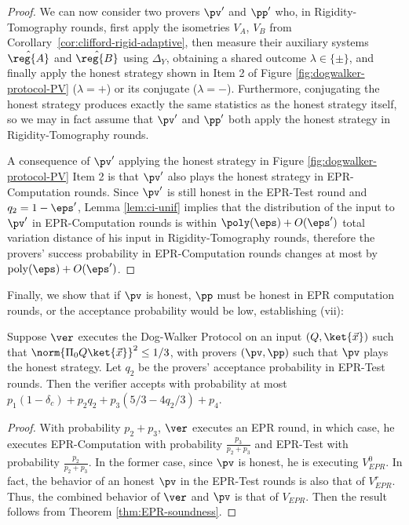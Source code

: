 \begin{proof}
We can now consider two provers $\pv'$ and $\pp'$ who, in Rigidity-Tomography rounds, first apply the isometries $V_A$, $V_B$ from Corollary~\ref{cor:clifford-rigid-adaptive}, then  measure their auxiliary systems $\hat{\reg{A}}$ and $\hat{\reg{B}}$ using $\Delta_Y$, obtaining a shared outcome $\lambda\in\{\pm\}$, and finally apply the honest strategy shown in Item 2 of Figure \ref{fig:dogwalker-protocol-PV} ($\lambda=+$) or its conjugate ($\lambda = -$). Furthermore, conjugating the honest strategy produces exactly the same statistics as the honest strategy itself, so we may in fact assume that $\pv'$ and $\pp'$ both apply the honest strategy in Rigidity-Tomography rounds. 


A consequence of $\pv'$ applying the honest strategy in Figure \ref{fig:dogwalker-protocol-PV} Item 2 is that $\pv'$ also plays the honest strategy in EPR-Computation rounds. Since $\pv'$ is still honest in the EPR-Test round and $q_2 = 1-\eps'$, Lemma \ref{lem:ci-unif} implies that the distribution of the input to $\pv'$ in EPR-Computation rounds is within $\poly(\eps)+O(\eps')$ total variation distance of his input in
Rigidity-Tomography rounds, therefore the provers' success probability in EPR-Computation rounds changes at most by $\mathrm{poly}(\eps)+O(\eps')$. 
\end{proof}


Finally, we show that if $\pv$ is honest, $\pp$ must be honest in EPR computation rounds, or the acceptance probability would be low, establishing (vii):
\begin{lemma}\label{lem:PP-3}
Suppose $\ver$ %
 executes the Dog-Walker Protocol on an input $(Q,\ket{\vec{x}})$ such that $\norm{\Pi_0 Q\ket{\vec{x}}}^2\leq 1/3$, with provers $(\pv,\pp)$ such that $\pv$ plays the honest strategy. Let $q_2$ be the provers' acceptance probability in EPR-Test rounds. Then the verifier accepts with probability at most
  $p_1(1-\delta_c) +p_2q_2+p_3(5/3-4q_2/3)+p_4$. 
\end{lemma}
\begin{proof}
With probability $p_2+p_3$, $\ver$ executes an EPR round, in which case, he executes EPR-Computation with probability $\frac{p_3}{p_2+p_3}$ and EPR-Test with probability $\frac{p_2}{p_2+p_3}$. In the former case, since $\pv$ is honest, he is executing $V_{EPR}^0$. In fact, the behavior of an honest $\pv$ in the EPR-Test rounds is also that of $V_{EPR}^r$. Thus, the combined behavior of $\ver$ and $\pv$ is that of $V_{EPR}$. Then the result follows from Theorem \ref{thm:EPR-soundness}. 
\end{proof}

